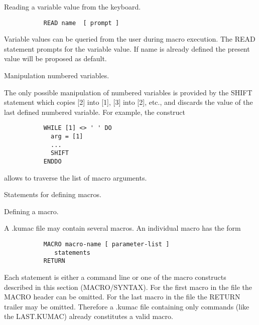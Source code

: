    \par
Reading a variable value from the keyboard.  

\begin{verbatim}
           READ name  [ prompt ]
\end{verbatim}
\ENDVERB
   \par
Variable values can be queried from the user during macro execution. The 
   READ statement prompts for the variable value. If name is already defined 
   the present value will be proposed as default.  

\ENDCMD


   \par
Manipulation numbered variables.  

   \par
The only possible manipulation of numbered variables is provided by the 
   SHIFT statement which copies [2] into [1], [3] into [2], etc., and discards 
   the value of the last defined numbered variable. For example, the construct 

\begin{verbatim}
           WHILE [1] <> ' ' DO
             arg = [1]
             ...
             SHIFT
           ENDDO
\end{verbatim}
\ENDVERB
   \par
allows to traverse the list of macro arguments.  

\ENDCMD
{}
\ifMENUtext
   \par
Statements for defining macros.  


\fi


   \par
Defining a macro.  

   \par
A .kumac file may contain several macros.  An individual macro has the form 

\begin{verbatim}
           MACRO macro-name [ parameter-list ]
              statements
           RETURN
\end{verbatim}
\ENDVERB
   \par
Each statement is either a command line or one of the macro constructs 
   described in this section (MACRO/SYNTAX).  For the first macro in the file 
   the MACRO header can be omitted.  For the last macro in the file the RETURN 
   trailer may be omitted.  Therefore a .kumac file containing only commands 
   (like the LAST.KUMAC) already constitutes a valid macro.  

